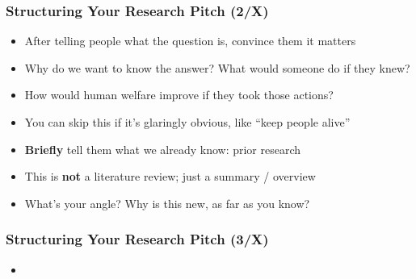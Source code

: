 \documentclass[aspectratio=169, handout]{beamer}
\begin{document}
\begin{frame}
\frametitle{Structuring Your Research Pitch (2/X)}

\begin{itemize}
	\item After telling people what the question is, convince them it matters
	
	\item <2->Why do we want to know the answer? What would someone do if they knew?
	
	\item <2->How would human welfare improve if they took those actions?
	
	\item <3->You can skip this if it's glaringly obvious, like ``keep people alive''
	
	\item <4->\textbf{Briefly} tell them what we already know: prior research
	
	\item <4->This is \textbf{not} a literature review; just a summary / overview
	
	\item <5->What's your angle? Why is this new, as far as you know?
\end{itemize}
\end{frame}

\begin{frame}
\frametitle{Structuring Your Research Pitch (3/X)}

\begin{itemize}
	\item 
\end{itemize}
\end{frame}
\end{document}
